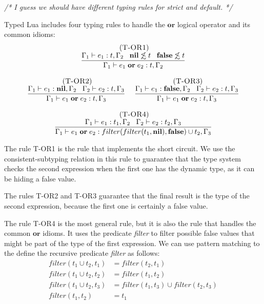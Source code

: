 \textit{/* I guess we should have different typing rules for strict and default. */}

Typed Lua includes four typing rules to handle the $\mathbf{or}$
logical operator and its common idioms:
\[
\begin{array}{c}
\begin{array}{c}
\; (\textsc{T-OR1})\\
\dfrac{\Gamma_{1} \vdash e_{1}:t, \Gamma_{2} \;\;\;
       \mathbf{nil} \not\lesssim t \;\;\;
       \mathbf{false} \not\lesssim t}
      {\Gamma_{1} \vdash e_{1} \; \mathbf{or} \; e_{2}:t, \Gamma_{2}}
\end{array}
\\ \\
\begin{array}{c}
\; (\textsc{T-OR2})\\
\dfrac{\Gamma_{1} \vdash e_{1}:\mathbf{nil}, \Gamma_{2} \;\;\;
       \Gamma_{2} \vdash e_{2}:t, \Gamma_{3}}
      {\Gamma_{1} \vdash e_{1} \; \mathbf{or} \; e_{2}:t, \Gamma_{3}}
\end{array}
\;
\begin{array}{c}
\; (\textsc{T-OR3})\\
\dfrac{\Gamma_{1} \vdash e_{1}:\mathbf{false}, \Gamma_{2} \;\;\;
       \Gamma_{2} \vdash e_{2}:t, \Gamma_{3}}
      {\Gamma_{1} \vdash e_{1} \; \mathbf{or} \; e_{2}:t, \Gamma_{3}}
\end{array}
\\ \\
\begin{array}{c}
\; (\textsc{T-OR4})\\
\dfrac{\Gamma_{1} \vdash e_{1}:t_{1}, \Gamma_{2} \;\;\;
       \Gamma_{2} \vdash e_{2}:t_{2}, \Gamma_{3}}
      {\Gamma_{1} \vdash e_{1} \; \mathbf{or} \; e_{2}:filter(filter(t_{1}, \mathbf{nil}), \mathbf{false}) \cup t_{2}, \Gamma_{3}}
\end{array}
\end{array}
\]

The rule \textsc{T-OR1} is the rule that implements the short circuit.
We use the consistent-subtyping relation in this rule to guarantee that
the type system checks the second expression when the first one
has the dynamic type, as it can be hiding a false value.

The rules \textsc{T-OR2} and \textsc{T-OR3} guarantee that the final
result is the type of the second expression, because the first one
is certainly a false value.

The rule \textsc{T-OR4} is the most general rule, but it is also
the rule that handles the common $\mathbf{or}$ idioms.
It uses the predicate \emph{filter} to filter possible false values
that might be part of the type of the first expression.
We can use pattern matching to the define the recursive predicate
\emph{filter} as follows:
\begin{align*}
filter(t_{1} \cup t_{2}, t_{1}) & = filter(t_{2}, t_{1})\\
filter(t_{1} \cup t_{2}, t_{2}) & = filter(t_{1}, t_{2})\\
filter(t_{1} \cup t_{2}, t_{3}) & = filter(t_{1}, t_{3}) \cup filter(t_{2}, t_{3})\\
filter(t_{1}, t_{2}) & = t_{1}
\end{align*}

